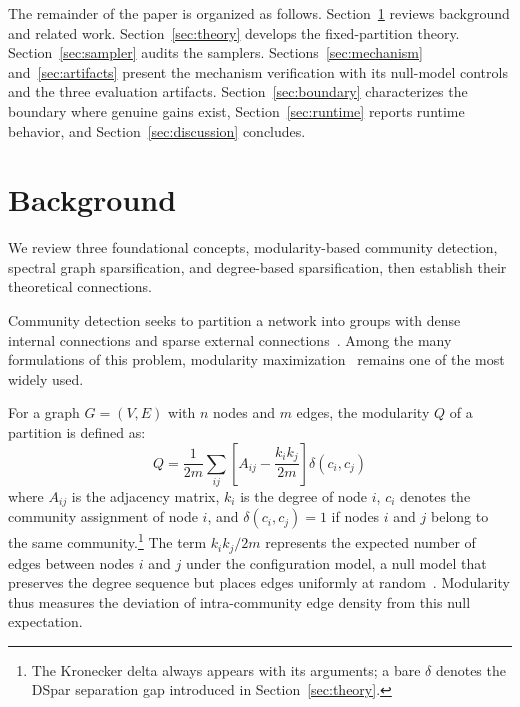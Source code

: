 \documentclass[10pt,journal,compsoc]{IEEEtran}
\begin{document}
The remainder of the paper is organized as follows.
Section~\ref{sec:background} reviews background and related work.
Section~\ref{sec:theory} develops the fixed-partition theory.
Section~\ref{sec:sampler} audits the samplers.
Sections~\ref{sec:mechanism} and~\ref{sec:artifacts} present the mechanism verification with its null-model controls and the three evaluation artifacts.
Section~\ref{sec:boundary} characterizes the boundary where genuine gains exist, Section~\ref{sec:runtime} reports runtime behavior, and Section~\ref{sec:discussion} concludes.


\section{Background}
\label{sec:background}

We review three foundational concepts, modularity-based community detection, spectral graph sparsification, and degree-based sparsification, then establish 
their theoretical connections.


Community detection seeks to partition a network into groups with dense 
internal connections and sparse external connections~\cite{fortunato2010community}. 
Among the many formulations of this problem, modularity 
maximization~\cite{newman2004finding,newman2006modularity} remains one of 
the most widely used.

For a graph $G = (V, E)$ with $n$ nodes and $m$ edges, the modularity $Q$ 
of a partition is defined as:
\begin{equation}
Q = \frac{1}{2m} \sum_{ij} \left[ A_{ij} - \frac{k_i k_j}{2m} \right] 
    \delta(c_i, c_j)
\label{eq:modularity}
\end{equation}
where $A_{ij}$ is the adjacency matrix, $k_i$ is the degree of node $i$, 
$c_i$ denotes the community assignment of node $i$, and $\delta(c_i, c_j) = 1$ 
if nodes $i$ and $j$ belong to the same community.\footnote{The Kronecker delta always appears with its arguments; a bare $\delta$ denotes the DSpar separation gap introduced in Section~\ref{sec:theory}.} The term $k_i k_j / 2m$ represents the expected number of edges between 
nodes $i$ and $j$ under the configuration model, a null model that preserves 
the degree sequence but places edges uniformly at 
random~\cite{newman2003structure,molloy1995critical}. Modularity thus 
measures the deviation of intra-community edge density from this null 
expectation.
\end{document}
